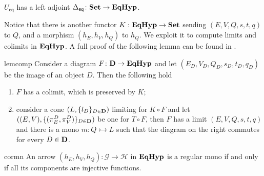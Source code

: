 \documentclass[3p]{elsarticle}
\newcommand{\eq}{\mathsf{eq}}
\newcommand{\Set}{\mathbf{Set}}
\def\D{\textbf {\textup{D}}}
\newcommand{\catname}[1]{\textbf{\textup{#1}}}
\newcommand{\EqHyp}{\catname{EqHyp}} %
\newcommand{\mto}{\rightarrowtail}
\theoremstyle{remark}
\theoremstyle{definition}
\begin{document}
\begin{cor}\label{cor:ladj}
	$U_{\eq}$ has a left adjoint $\Delta_{\eq}\colon \Set \to \EqHyp$.
\end{cor}

Notice that there is another functor $K: \EqHyp \to \Set$ sending $(E, V, Q, s, t, q)$ to $Q$, and a morphism $(h_E, h_V, h_Q)$ to $h_Q$. We  exploit it to compute limits and colimits in $\EqHyp$. A full proof of the following lemma can be found in .

\noindent
\begin{minipage}[l]{.83\linewidth}
	\begin{restatable}{lem}{comp}\label{prop:eqhyp_complete}
		Consider a diagram $F\colon \D \to \EqHyp$ and let $(E_D, V_D, Q_D, s_D, t_D, q_D)$ be the image of an object $D$. Then the following hold
		\begin{enumerate}
			\item $F$ has a colimit, which is preserved by $K$;
			\item consider a cone $(L, \{l_D\}_{D\in \D})$ limiting  for $K \circ F$ and let $((E, V), \{(\pi^D_E, \pi^D_V)\}_{D\in \D})$ be one for $T\circ F$, then $F$ has a limit $(E, V, Q, s, t, q)$ and there is a mono $m\colon Q\mto L$ such that the diagram on the right commutes for every $D\in \D$.
		\end{enumerate}
	\end{restatable}
\end{minipage}\hfill
\begin{minipage}[r]{.15\linewidth}
\end{minipage} 
  
\begin{restatable}{cor}{mn}\label{cor:mono2}
	An arrow $(h_E, h_V, h_Q): \mathcal{G\to H}$ in $\EqHyp$ is a regular mono if and only if all its components are injective functions.
\end{restatable}
\end{document}
